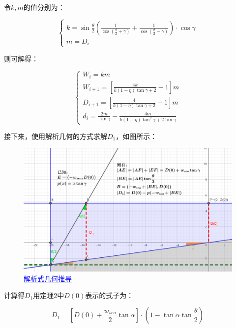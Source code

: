 令$k, m$的值分别为：

\begin{equation}
    \begin{cases}
        k = 
        \sin\frac{\theta}{2}\left(
            \frac{1}{\cos(\frac{\theta}{2}+\gamma)} + 
            \frac{1}{\cos(\frac{\theta}{2}-\gamma)}
        \right) \cdot \cos \gamma\\
        m = D_i
    \end{cases}
\end{equation}

则可解得：

\begin{equation}
    \begin{cases}
        W_i = km\\
        W_{i + 1} = \left[\frac{4k}{k(1 - \eta) \tan \gamma + 2} - 1\right]m\\
        D_{i + 1} = \left[\frac{4}{k(1 - \eta) \tan \gamma + 2} - 1\right]m\\
        d_i = \frac{2m}{\tan \gamma} - \frac{4m}{k(1-\eta) \tan^2 \gamma + 2 \tan \gamma}
    \end{cases}
\end{equation}

接下来，使用解析几何的方式求解$D_1$，如图所示：

\begin{figure}[h]   
    \centering
    \includegraphics[scale=0.3]{res/img/解析式几何推导.png}
    \caption{\href{https://www.geogebra.org/m/ycxg4tw9}{\textcolor{blue}{解析式几何推导}}}
    \label{fig:解析式几何推导}
\end{figure}

计算得$D_1$用定理2中$D(0)$表示的式子为：

\begin{equation}
    D_1 = \left[ D(0) + \frac{w_{sea}}{2} \tan \alpha \right] \cdot \left( 1 - \tan \alpha \tan \frac{\theta}{2} \right)
\end{equation}

